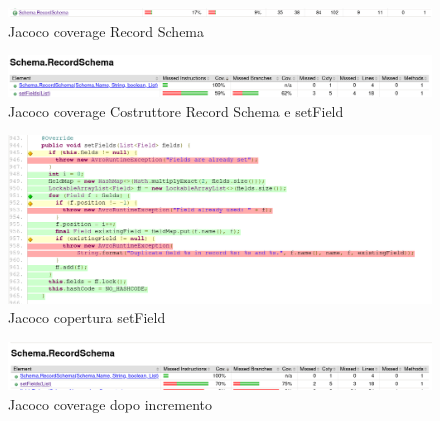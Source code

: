 \documentclass[10pt, a4paper]{article}
\begin{document}
  \begin{figure}
    \includegraphics[width=\linewidth]{./images/create_record/JacocoCoverage2.png}
    \caption{Jacoco coverage Record Schema}
    \label{fig:JacocoCoverageCreateRecord2}
  \end{figure}

  \begin{figure}
    \includegraphics[width=\linewidth]{./images/create_record/JacocoCoverage3.png}
    \caption{Jacoco coverage Costruttore Record Schema e setField}
    \label{fig:JacocoCoverageCreateRecord3}
  \end{figure}

  \begin{figure}
    \includegraphics[width=\linewidth]{./images/create_record/JacocoCoverage4.png}
    \caption{Jacoco copertura setField}
    \label{fig:JacocoCoverageCreateRecord4}
  \end{figure}

  \begin{figure}
    \includegraphics[width=\linewidth]{./images/create_record/JacocoCoverage5.png}
    \caption{Jacoco coverage dopo incremento}
    \label{fig:JacocoCoverageCreateRecord5}
  \end{figure}
\end{document}
